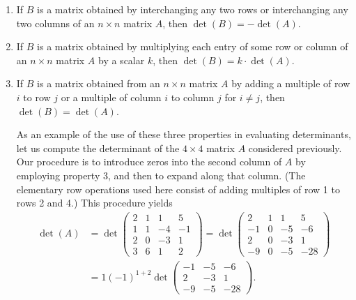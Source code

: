 \documentclass{report}
\begin{document}
    \begin{enumerate}
        \item If $B$ is a matrix obtained by interchanging any two rows or interchanging any two columns of an $n \times n$ matrix $A$, then $\operatorname{det}(B)=-\operatorname{det}(A)$.

        \item If $B$ is a matrix obtained by multiplying each entry of some row or column of an $n \times n$ matrix $A$ by a scalar $k$, then $\operatorname{det}(B)=k \cdot \operatorname{det}(A)$.

        \item If $B$ is a matrix obtained from an $n \times n$ matrix $A$ by adding a multiple of row $i$ to row $j$ or a multiple of column $i$ to column $j$ for $i \neq j$, then $\operatorname{det}(B)=\operatorname{det}(A)$.

        As an example of the use of these three properties in evaluating determinants, let us compute the determinant of the $4 \times 4$ matrix $A$ considered previously. Our procedure is to introduce zeros into the second column of $A$ by employing property 3, and then to expand along that column. (The elementary row operations used here consist of adding multiples of row 1 to rows 2 and 4.) This procedure yields
        $$
        \begin{aligned}
        \operatorname{det}(A) & =\operatorname{det}\left(\begin{array}{rrrr}
        2 & 1 & 1 & 5 \\
        1 & 1 & -4 & -1 \\
        2 & 0 & -3 & 1 \\
        3 & 6 & 1 & 2
        \end{array}\right)=\operatorname{det}\left(\begin{array}{rrrr}
        2 & 1 & 1 & 5 \\
        -1 & 0 & -5 & -6 \\
        2 & 0 & -3 & 1 \\
        -9 & 0 & -5 & -28
        \end{array}\right) \\
        & =1(-1)^{1+2} \operatorname{det}\left(\begin{array}{rrr}
        -1 & -5 & -6 \\
        2 & -3 & 1 \\
        -9 & -5 & -28
        \end{array}\right) .
        \end{aligned}
        $$


\end{enumerate}
\end{document}
